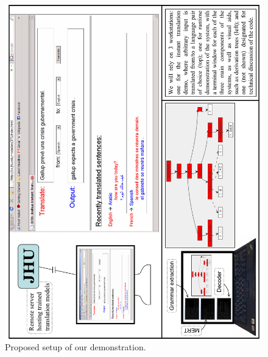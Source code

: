 \documentclass[11pt]{article}
\begin{document}
\begin{center}
\begin{figure}
\includegraphics[scale=0.75]{demo-setup.pdf}
\caption{Proposed setup of our demonstration.}
\label{fig:setup}
\end{figure}
\end{center}







\end{document}
